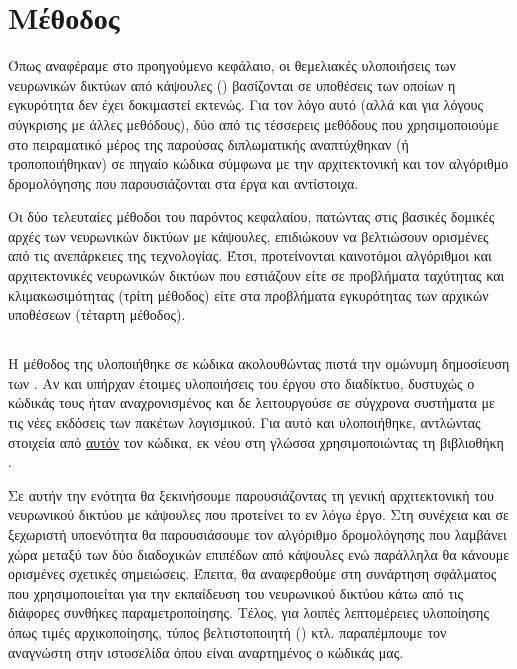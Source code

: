 \chapter{Μέθοδος}
\label{chap:method}

Όπως αναφέραμε στο προηγούμενο κεφάλαιο, οι θεμελιακές υλοποιήσεις των νευρωνικών δικτύων από κάψουλες (\cite{hinton2011transforming, sabour2017dynamic, hinton2018matrix}) βασίζονται σε υποθέσεις των οποίων η εγκυρότητα δεν έχει δοκιμαστεί εκτενώς. Για τον λόγο αυτό (αλλά και για λόγους σύγκρισης με άλλες μεθόδους), δύο από τις τέσσερεις μεθόδους που χρησιμοποιούμε στο πειραματικό μέρος της παρούσας διπλωματικής αναπτύχθηκαν (ή τροποποιήθηκαν) σε πηγαίο κώδικα σύμφωνα με την αρχιτεκτονική και τον αλγόριθμο δρομολόγησης που παρουσιάζονται στα έργα \cite{sabour2017dynamic} και \cite{hinton2018matrix} αντίστοιχα. \par

Οι δύο τελευταίες μέθοδοι του παρόντος κεφαλαίου, πατώντας στις βασικές δομικές αρχές των νευρωνικών δικτύων με κάψουλες, επιδιώκουν να βελτιώσουν ορισμένες από τις ανεπάρκειες της τεχνολογίας. Έτσι, προτείνονται καινοτόμοι αλγόριθμοι και αρχιτεκτονικές νευρωνικών δικτύων που εστιάζουν είτε σε προβλήματα ταχύτητας και κλιμακωσιμότητας (τρίτη μέθοδος) είτε στα προβλήματα εγκυρότητας των αρχικών υποθέσεων (τέταρτη μέθοδος).


\section{}
\label{sec:method_1}

Η μέθοδος της  υλοποιήθηκε σε κώδικα ακολουθώντας πιστά την ομώνυμη δημοσίευση των  \cite{sabour2017dynamic}. Αν και υπήρχαν έτοιμες υλοποιήσεις του έργου στο διαδίκτυο, δυστυχώς ο κώδικάς τους ήταν αναχρονισμένος και δε λειτουργούσε σε σύγχρονα συστήματα με τις νέες εκδόσεις των πακέτων λογισμικού. Για αυτό και υλοποιήθηκε, αντλώντας στοιχεία από \href{https://github.com/adambielski/CapsNet-pytorch}{αυτόν} τον κώδικα, εκ νέου στη γλώσσα  χρησιμοποιώντας τη βιβλιοθήκη . \par

Σε αυτήν την ενότητα θα ξεκινήσουμε παρουσιάζοντας τη γενική αρχιτεκτονική του νευρωνικού δικτύου με κάψουλες που προτείνει το εν λόγω έργο. Στη συνέχεια και σε ξεχωριστή υπο\textendash ενότητα θα παρουσιάσουμε τον αλγόριθμο δρομολόγησης που λαμβάνει χώρα μεταξύ των δύο διαδοχικών επιπέδων από κάψουλες ενώ παράλληλα θα κάνουμε ορισμένες σχετικές σημειώσεις. Έπειτα, θα αναφερθούμε στη συνάρτηση σφάλματος που χρησιμοποιείται για την εκπαίδευση του νευρωνικού δικτύου κάτω από τις διάφορες συνθήκες παραμετροποίησης. Τέλος, για λοιπές λεπτομέρειες υλοποίησης όπως τιμές αρχικοποίησης, τύπος βελτιστοποιητή () κτλ. παραπέμπουμε τον αναγνώστη στην ιστοσελίδα όπου είναι αναρτημένος ο κώδικάς μας.

